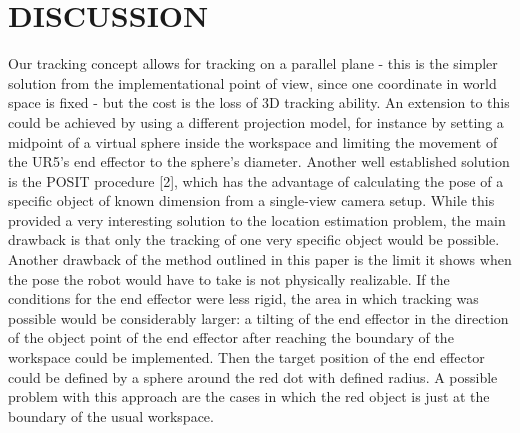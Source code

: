 \documentclass[letterpaper, 10 pt, conference]{ieeeconf}  %
\begin{document}
\section{DISCUSSION}
Our tracking concept allows for tracking on a parallel plane - this is  the simpler solution from the implementational point of view, since one coordinate in world space is fixed - but the cost is the loss of 3D tracking ability. An extension to this could be achieved by using a different projection model, for instance by setting a midpoint of a virtual sphere inside the workspace and limiting the movement of the UR5's end effector to the sphere's diameter. Another well established solution is the POSIT procedure [2], which has the advantage of calculating the pose of a specific object of known dimension from a single-view camera setup. While this provided a very interesting solution to the location estimation problem, the main drawback is that only the tracking of one very specific object would be possible.\\Another drawback of the method outlined in this paper is the limit it shows when the pose the robot would have to take is not physically realizable. If the conditions for the end effector were less rigid, the area in which tracking was possible would be considerably larger: a tilting of the end effector in the direction of the object point of the end effector after reaching the boundary of the workspace could be implemented. Then the target position of the end effector could be defined by a sphere around the red dot with defined radius. A possible problem with this approach are the cases in which the red object is just at the boundary of the usual workspace.


   
\end{document}
